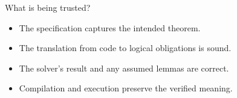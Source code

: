 \begin{frame}{What is being trusted?}
\begin{itemize}
\item The specification captures the intended theorem.
\pause
\item The translation from code to logical obligations is sound.
\pause
\item The solver's result and any assumed lemmas are correct.
\pause
\item Compilation and execution preserve the verified meaning.
\end{itemize}
\end{frame}

